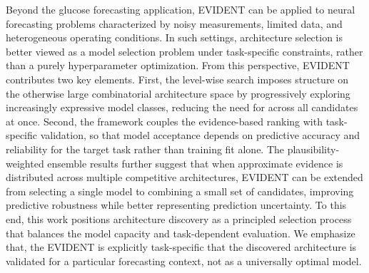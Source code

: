\documentclass[preprint,12pt]{elsarticle}
\begin{document}
Beyond the glucose forecasting application, EVIDENT can be applied to neural forecasting problems characterized by noisy measurements, limited data, and heterogeneous operating conditions. In such settings, architecture selection is better viewed as a model selection problem under task-specific constraints, rather than a purely hyperparameter optimization. From this perspective, EVIDENT contributes two key elements. 
First, the level-wise search imposes structure on the otherwise large combinatorial architecture space by progressively exploring increasingly expressive model classes, reducing the need for across all candidates at once. 
Second, the framework couples the evidence-based ranking with task-specific validation, so that model acceptance depends on predictive accuracy and reliability for the target task rather than training fit alone. 
The plausibility-weighted ensemble results further suggest that when approximate evidence is distributed across multiple competitive architectures, EVIDENT can be extended from selecting a single model to combining a small set of candidates, improving predictive robustness while better representing prediction uncertainty.
To this end, this work positions architecture discovery as a principled selection process that balances the model capacity and task-dependent evaluation.
We emphasize that, the EVIDENT is explicitly task-specific that the discovered architecture is validated for a particular forecasting context, not as a universally optimal model.
\end{document}
